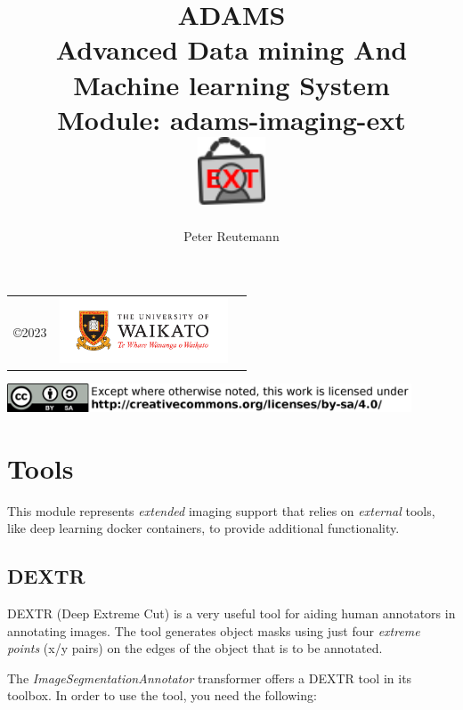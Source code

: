 \documentclass[a4paper]{book}
\title{
  \textbf{ADAMS} \\
  {\Large \textbf{A}dvanced \textbf{D}ata mining \textbf{A}nd \textbf{M}achine
  learning \textbf{S}ystem} \\
  {\Large Module: adams-imaging-ext} \\
  \vspace{1cm}
  \includegraphics[width=2cm]{images/imaging-ext-module.png} \\
}
\author{
  Peter Reutemann
}
\begin{document}
\begin{titlepage}
\maketitle

\thispagestyle{empty}
\center
\begin{table}[b]
	\begin{tabular}{c l l}
		\parbox[c][2cm]{2cm}{\copyright 2023} &
		\parbox[c][2cm]{5cm}{\includegraphics[width=5cm]{images/coat_of_arms.pdf}} \\
	\end{tabular}
	\includegraphics[width=12cm]{images/cc.png} \\
\end{table}

\end{titlepage}

\tableofcontents

\chapter{Tools}
This module represents \textit{extended} imaging support that relies on \textit{external}
tools, like deep learning docker containers, to provide additional functionality.

\section{DEXTR}
DEXTR\cite{dextr} (Deep Extreme Cut) is a very useful tool for aiding human annotators in
annotating images. The tool generates object masks using just four \textit{extreme points}
(x/y pairs) on the edges of the object that is to be annotated.

The \textit{ImageSegmentationAnnotator} transformer offers a DEXTR tool in its toolbox. In order
to use the tool, you need the following:
\end{document}
